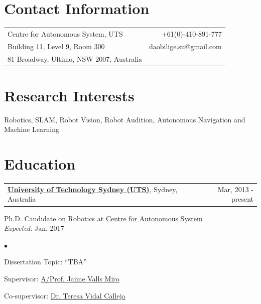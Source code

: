 \documentclass[margin,line]{res}
\newenvironment{list1}{
  \begin{list}{\ding{113}}{%
      \setlength{\itemsep}{0in}
      \setlength{\parsep}{0in} \setlength{\parskip}{0in}
      \setlength{\topsep}{0in} \setlength{\partopsep}{0in} 
      \setlength{\leftmargin}{0.17in}}}{\end{list}}
\newenvironment{list2}{
  \begin{list}{$\bullet$}{%
      \setlength{\itemsep}{0in}
      \setlength{\parsep}{0in} \setlength{\parskip}{0in}
      \setlength{\topsep}{0in} \setlength{\partopsep}{0in} 
      \setlength{\leftmargin}{0.2in}}}{\end{list}}
\begin{document}

\begin{resume}



\section{\sc Contact Information}
\vspace{.05in}
\begin{tabularx}{\textwidth}{X r}
Centre for Autonomous System, UTS      &  +61(0)-410-891-777 \\            
Building 11, Level 9, Room 300         & daobilige.su@gmail.com \\         
81 Broadway, Ultimo, NSW 2007, Australia  & \\%
\end{tabularx}



\section{\sc Research Interests}
Robotics, SLAM, Robot Vision, Robot Audition, Autonomous Navigation and Machine Learning



\section{\sc Education}
\begin{tabularx}{\textwidth}{X r}
\href{http://www.uts.edu.au}{{\bf University of Technology Sydney (UTS)}}, Sydney, Australia  &Mar, 2013 - present\\
\end{tabularx}
\vspace*{-.1in}
\begin{list1}
\item[] Ph.D. Candidate on Robotics at \href{http://www.cas.uts.edu.au}{Centre for Autonomous System}\\ {\it Expected:} Jan. 2017
\begin{list2}
\vspace*{.05in}
\item Dissertation Topic:  ``TBA'' 
\item Supervisor: \href{http://www.uts.edu.au/staff/jaime.vallsmiro}{A/Prof. Jaime Valls Miro}
\item Co-supervisor:  \href{http://www.uts.edu.au/staff/teresa.vidalcalleja}{Dr. Teresa Vidal Calleja}
\end{list2}
\end{list1}


\end{resume}
\end{document}
